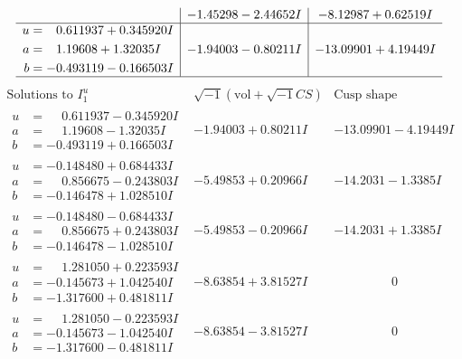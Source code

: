 \documentclass[1p]{elsarticle_modified}
\theoremstyle{definition}
\newcommand{\I}{\sqrt{-1}}
\begin{document}
$$\begin{array}{c|c|c}
 & -1.45298 - 2.44652 I & -8.12987 + 0.62519 I \\ \hline\begin{aligned}
u &= \phantom{-}0.611937 + 0.345920 I \\
a &= \phantom{-}1.19608 + 1.32035 I \\
b &= -0.493119 - 0.166503 I\end{aligned}
 & -1.94003 - 0.80211 I & -13.09901 + 4.19449 I\\
 \hline 
 \end{array}$$\newpage$$\begin{array}{c|c|c}  
\text{Solutions to }I^u_{1}& \I (\text{vol} + \sqrt{-1}CS) & \text{Cusp shape}\\
 \hline 
\begin{aligned}
u &= \phantom{-}0.611937 - 0.345920 I \\
a &= \phantom{-}1.19608 - 1.32035 I \\
b &= -0.493119 + 0.166503 I\end{aligned}
 & -1.94003 + 0.80211 I & -13.09901 - 4.19449 I \\ \hline\begin{aligned}
u &= -0.148480 + 0.684433 I \\
a &= \phantom{-}0.856675 - 0.243803 I \\
b &= -0.146478 + 1.028510 I\end{aligned}
 & -5.49853 + 0.20966 I & -14.2031 - 1.3385 I \\ \hline\begin{aligned}
u &= -0.148480 - 0.684433 I \\
a &= \phantom{-}0.856675 + 0.243803 I \\
b &= -0.146478 - 1.028510 I\end{aligned}
 & -5.49853 - 0.20966 I & -14.2031 + 1.3385 I \\ \hline\begin{aligned}
u &= \phantom{-}1.281050 + 0.223593 I \\
a &= -0.145673 + 1.042540 I \\
b &= -1.317600 + 0.481811 I\end{aligned}
 & -8.63854 + 3.81527 I & \phantom{-0.000000 } 0 \\ \hline\begin{aligned}
u &= \phantom{-}1.281050 - 0.223593 I \\
a &= -0.145673 - 1.042540 I \\
b &= -1.317600 - 0.481811 I\end{aligned}
 & -8.63854 - 3.81527 I & \phantom{-0.000000 } 0 \\ \hline\begin{aligned}

\end{aligned}
\end{array}$$
\end{document}
